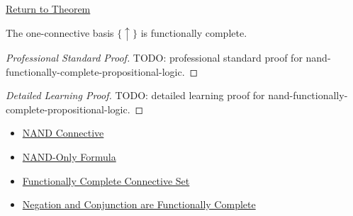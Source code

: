 \newpage
{}
\label{prf:nand-functionally-complete-propositional-logic}

\begin{remark*}[Return]
\hyperref[thm:nand-functionally-complete-propositional-logic]{Return to Theorem}
\end{remark*}

\begin{theorem*}
The one-connective basis \(\{\uparrow\}\) is functionally complete.
\end{theorem*}

\begin{proof}[Professional Standard Proof]
\LRAProofBodyStart
TODO: professional standard proof for nand-functionally-complete-propositional-logic.
\end{proof}

\begin{proof}[Detailed Learning Proof]
\LRAProofBodyStart
TODO: detailed learning proof for nand-functionally-complete-propositional-logic.
\end{proof}

\begin{remark*}
\end{remark*}

\begin{dependencies}
\begin{itemize}
  \item \hyperref[def:nand-connective-propositional-logic]{NAND Connective}
  \item \hyperref[def:nand-only-formula-propositional-logic]{NAND-Only Formula}
  \item \hyperref[def:functionally-complete-connective-set-propositional-logic]{Functionally Complete Connective Set}
  \item \hyperref[thm:negation-conjunction-functionally-complete-propositional-logic]{Negation and Conjunction are Functionally Complete}
\end{itemize}
\end{dependencies}

\clearpage
